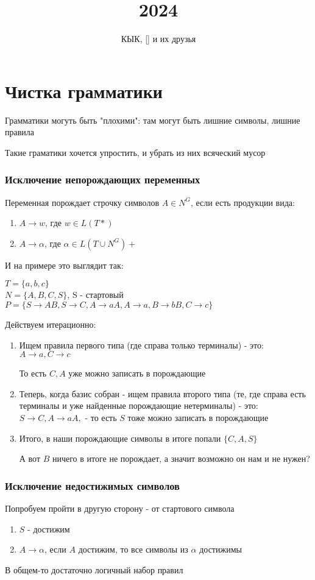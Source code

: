 \documentclass{article}
\title{2024}
\author{КЫК, [] и их друзья}
\begin{document}
\maketitle
\tableofcontents

\part{Чистка грамматики}
Грамматики могуть быть "плохими": там могут быть лишние символы, лишние правила

Такие граматики хочется упростить, и убрать из них всяческий мусор

\section{Исключение непорождающих переменных}
Переменная порождает строчку символов $A \in N^G$, если есть продукции вида: \\
\begin{enumerate}
  \item $ A \to w$, где $w \in L(T*)$
  \item $ A \to \alpha$, где $\alpha \in L(T\cup N^G)+$
\end{enumerate}
И на примере это выглядит так:

$T = \{a,b,c\}$ \\
$N = \{A,B,C,S\}$, S - стартовый \\
$P = \{ S \to AB, S \to C, A \to aA, A \to a, B \to bB, C \to c\}$

Действуем итерационно:
\begin{enumerate}
  \item Ищем правила первого типа (где справа только терминалы) - это: 
        $A \to a, C \to c$
            
    То есть $C, A$ уже можно записать в порождающие
    \item Теперь, когда базис собран - ищем правила второго типа 
    (те, где справа есть терминалы и уже найденные порождающие нетерминалы) - это:
    $S \to C, A \to aA, $ - то есть $S$ тоже можно записать в порождающие
    \item Итого, в наши порождающие символы в итоге попали $\{C,A,S\}$
    
    А вот $B$ ничего в итоге не порождает, а значит возможно он нам и не нужен?
\end{enumerate}

\section{Исключение недостижимых символов}
Попробуем пройти в другую сторону - от стартового символа
\begin{enumerate}
  \item $S$ - достижим
    \item $A \to \alpha$, если $A$ достижим, то все символы из $\alpha$ достижимы
\end{enumerate}
В общем-то достаточно логичный набор правил
\end{document}

